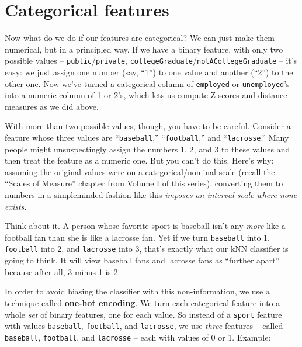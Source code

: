 \section{Categorical features}

Now what do we do if our features are categorical? We can just make them
numerical, but in a principled way. If we have a binary feature, with only two
possible values -- \texttt{public}/\texttt{private},
\texttt{collegeGraduate}/\texttt{notACollegeGraduate} -- it's easy: we just
assign one number (say, ``1'') to one value and another (``2'') to the other
one. Now we've turned a categorical column of
\texttt{employed}-or-\texttt{unemployed}'s into a numeric column of 1-or-2's,
which lets us compute Z-scores and distance measures as we did above.


With more than two possible values, though, you have to be careful. Consider a
feature whose three values are ``\texttt{baseball},'' ``\texttt{football},''
and ``\texttt{lacrosse}.'' Many people might unsuspectingly assign the numbers
1, 2, and 3 to these values and then treat the feature as a numeric one. But
you can't do this. Here's why: assuming the original values were on a
categorical/nominal scale (recall the ``Scales of Measure'' chapter from Volume
I of this series), converting them to numbers in a simpleminded fashion like
this \textit{imposes an interval scale where none exists.}

Think about it. A person whose favorite sport is baseball isn't any
\textit{more} like a football fan than she is like a lacrosse fan. Yet if we
turn \texttt{baseball} into 1, \texttt{football} into 2, and \texttt{lacrosse}
into 3, that's exactly what our kNN classifier is going to think. It will view
baseball fans and lacrosse fans as ``further apart'' because after all, 3 minus
1 is 2.


In order to avoid biasing the classifier with this non-information, we use a
technique called \textbf{one-hot encoding}. We turn each categorical feature
into a whole \textit{set} of binary features, one for each value. So instead of
a \texttt{sport} feature with values \texttt{baseball}, \texttt{football}, and
\texttt{lacrosse}, we use \textit{three} features -- called \texttt{baseball},
\texttt{football}, and \texttt{lacrosse} -- each with values of 0 or 1.
Example:

